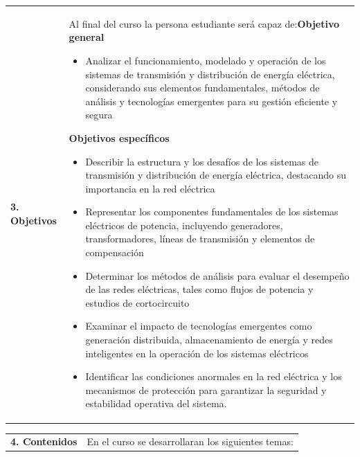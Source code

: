 \documentclass[letterpaper]{article}%
\begin{document}
\begin{tabularx}{\textwidth}{p{3cm}p{13cm}}%
\par\fontsize{12}{14}\selectfont \textbf{\textcolor{parte}{3. Objetivos}}&Al final del curso la persona estudiante será capaz de:\newline\newline \textbf{Objetivo general}\begin{itemize}\item Analizar el funcionamiento, modelado y operación de los sistemas de transmisión y distribución de energía eléctrica, considerando sus elementos fundamentales, métodos de análisis y tecnologías emergentes para su gestión eficiente y segura\end{itemize} \vspace{2mm}\textbf{Objetivos específicos}\begin{itemize}\item Describir la estructura y los desafíos de los sistemas de transmisión y distribución de energía eléctrica, destacando su importancia en la red eléctrica\item Representar los componentes fundamentales de los sistemas eléctricos de potencia, incluyendo generadores, transformadores, líneas de transmisión y elementos de compensación\item Determinar los métodos de análisis para evaluar el desempeño de las redes eléctricas, tales como flujos de potencia y estudios de cortocircuito\item Examinar el impacto de tecnologías emergentes como generación distribuida, almacenamiento de energía y redes inteligentes en la operación de los sistemas eléctricos\item Identificar las condiciones anormales en la red eléctrica y los mecanismos de protección para garantizar la seguridad y estabilidad operativa del sistema.\end{itemize}\\%
\end{tabularx}%
\newpage%
\begin{tabularx}{\textwidth}{p{3cm}p{13cm}}%
\par\fontsize{12}{14}\selectfont \textbf{\textcolor{parte}{4. Contenidos}}&En el curso se desarrollaran los siguientes temas:\\%
\end{tabularx}%
\newline%
\end{document}
